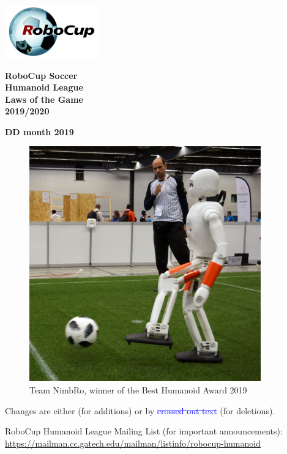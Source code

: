 \documentclass[a4paper]{article}
\title{}
\author{\rulesauthor}
\date{2018-11-04}
\newcommand{\removed}[1]{\textcolor{blue}{\sout{#1}}}
\newcommand{\added}[1]{{\color{magenta}{#1}}}
\begin{document}
\sffamily

\begin{center}
\includegraphics[width=1.6264in,height=0.9055in]{img/robocup_logo.jpg}

{\Huge \bfseries
RoboCup Soccer
\\
Humanoid League
\\
Laws of the Game
\\ \vspace{0.5cm}
2019/2020 \added{-- DRAFT} }

\bigskip

{\bfseries DD month 2019}
\end{center}

\begin{figure}[!h]
\centering
\includegraphics[height=4in]{img/nimbro_robot.jpg}
\captionsetup{labelformat=empty}
\caption{Team NimbRo, winner of the Best Humanoid Award 2019}
\end{figure}

{\large Changes are either \added{marked in magenta text colour} (for additions) or by  \removed{crossed out text} (for deletions).}

\bigskip
RoboCup Humanoid League Mailing List (for important announcements):\\
\url{https://mailman.cc.gatech.edu/mailman/listinfo/robocup-humanoid}
\end{document}
